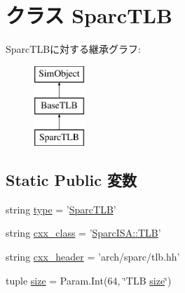 \hypertarget{classSparcTLB_1_1SparcTLB}{
\section{クラス SparcTLB}
\label{classSparcTLB_1_1SparcTLB}
}
SparcTLBに対する継承グラフ:\begin{figure}[H]
\begin{center}
\leavevmode
\includegraphics[height=3cm]{classSparcTLB_1_1SparcTLB}
\end{center}
\end{figure}
\subsection*{Static Public 変数}
\begin{DoxyCompactItemize}
\item 
string \hyperlink{classSparcTLB_1_1SparcTLB_acce15679d830831b0bbe8ebc2a60b2ca}{type} = '\hyperlink{classSparcTLB_1_1SparcTLB}{SparcTLB}'
\item 
string \hyperlink{classSparcTLB_1_1SparcTLB_a58cd55cd4023648e138237cfc0822ae3}{cxx\_\-class} = '\hyperlink{classSparcISA_1_1TLB}{SparcISA::TLB}'
\item 
string \hyperlink{classSparcTLB_1_1SparcTLB_a17da7064bc5c518791f0c891eff05fda}{cxx\_\-header} = 'arch/sparc/tlb.hh'
\item 
tuple \hyperlink{classSparcTLB_1_1SparcTLB_a377e5da8df1f89c5468c8b8cd07eac89}{size} = Param.Int(64, \char`\"{}TLB \hyperlink{classSparcTLB_1_1SparcTLB_a377e5da8df1f89c5468c8b8cd07eac89}{size}\char`\"{})
\end{DoxyCompactItemize}


